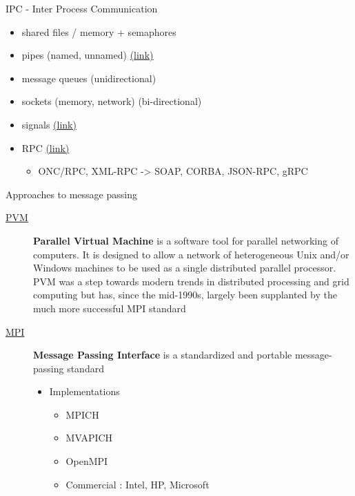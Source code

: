 \documentclass[ignorenonframetext,]{beamer}
\providecommand{\tightlist}{%
  \setlength{\itemsep}{0pt}\setlength{\parskip}{0pt}}
\begin{document}
\begin{frame}{IPC - Inter Process Communication}

\begin{itemize}
\tightlist
\item
  shared files / memory + semaphores
\item
  pipes (named, unnamed)
  \href{https://opensource.com/article/19/4/interprocess-communication-linux-channels}{(link)}
\item
  message queues (unidirectional)
\item
  sockets (memory, network) (bi-directional)
\item
  signals
  \href{https://opensource.com/article/19/4/interprocess-communication-linux-networking}{(link)}
\item
  RPC \href{https://en.wikipedia.org/wiki/Remote_procedure_call}{(link)}

  \begin{itemize}
  \tightlist
  \item
    ONC/RPC, XML-RPC -\textgreater{} SOAP, CORBA, JSON-RPC, gRPC
  \end{itemize}

\end{itemize}


\end{frame}

\begin{frame}{Approaches to message passing}

\begin{description}
\item[\href{https://en.wikipedia.org/wiki/Parallel_Virtual_Machine}{PVM}]
\textbf{Parallel Virtual Machine} is a software tool for parallel
networking of computers. It is designed to allow a network of
heterogeneous Unix and/or Windows machines to be used as a single
distributed parallel processor. PVM was a step towards modern trends in
distributed processing and grid computing but has, since the mid-1990s,
largely been supplanted by the much more successful MPI standard
\item[\href{https://tinyurl.com/6mfo5pf}{MPI}]
\textbf{Message Passing Interface} is a standardized and portable
message-passing standard

\begin{itemize}
\tightlist
\item
  Implementations

  \begin{itemize}
  \tightlist
  \item
    MPICH
  \item
    MVAPICH
  \item
    OpenMPI
  \item
    Commercial : Intel, HP, Microsoft
  \end{itemize}

\end{itemize}

\end{description}


\end{frame}
\end{document}
